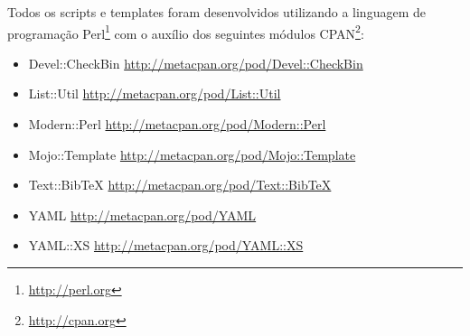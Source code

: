 
Todos os scripts e templates foram desenvolvidos utilizando a linguagem de
programação Perl\footnote{\url{http://perl.org}} com o auxílio dos seguintes
módulos CPAN\footnote{\url{http://cpan.org}}:

\begin{itemize}
  \item Devel::CheckBin \url{http://metacpan.org/pod/Devel::CheckBin}
  \item List::Util \url{http://metacpan.org/pod/List::Util}
  \item Modern::Perl \url{http://metacpan.org/pod/Modern::Perl}
  \item Mojo::Template \url{http://metacpan.org/pod/Mojo::Template}
  \item Text::BibTeX \url{http://metacpan.org/pod/Text::BibTeX}
  \item YAML \url{http://metacpan.org/pod/YAML}
  \item YAML::XS \url{http://metacpan.org/pod/YAML::XS}
\end{itemize}




